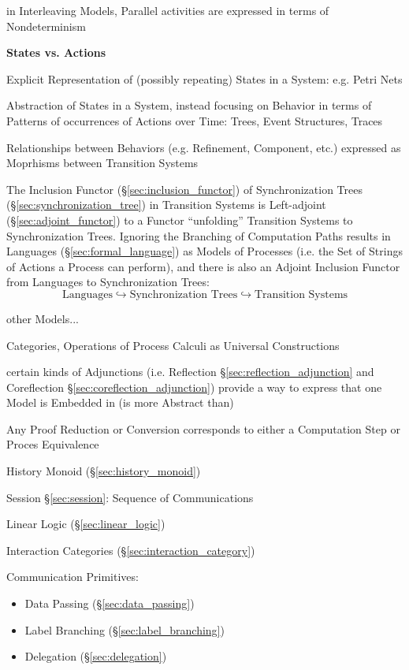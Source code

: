 in Interleaving Models, Parallel activities are expressed in terms of
Nondeterminism


\textbf{States vs. Actions}

Explicit Representation of (possibly repeating) States in a System:
e.g. Petri Nets

Abstraction of States in a System, instead focusing on Behavior in
terms of Patterns of occurrences of Actions over Time: Trees, Event
Structures, Traces


Relationships between Behaviors (e.g. Refinement, Component, etc.)
expressed as Moprhisms between Transition Systems

The Inclusion Functor (\S\ref{sec:inclusion_functor}) of
Synchronization Trees (\S\ref{sec:synchronization_tree}) in Transition
Systems is Left-adjoint (\S\ref{sec:adjoint_functor}) to a Functor
``unfolding'' Transition Systems to Synchronization Trees. Ignoring
the Branching of Computation Paths results in Languages
(\S\ref{sec:formal_language}) as Models of Processes (i.e. the Set of
Strings of Actions a Process can perform), and there is also an
Adjoint Inclusion Functor from Languages to Synchronization Trees:
\[
  \text{Languages} \hookrightarrow \text{Synchronization Trees}
    \hookrightarrow \text{Transition Systems}
\]

other Models...

Categories, Operations of Process Calculi as Universal Constructions

certain kinds of Adjunctions (i.e. Reflection
\S\ref{sec:reflection_adjunction} and Coreflection
\S\ref{sec:coreflection_adjunction}) provide a way to express that one
Model is Embedded in (is more Abstract than)


\asterism


Any Proof Reduction or Conversion corresponds to either a Computation
Step or Proces Equivalence \cite{caires-pfenning10}

History Monoid (\S\ref{sec:history_monoid})

Session \S\ref{sec:session}: Sequence of Communications

Linear Logic (\S\ref{sec:linear_logic})

Interaction Categories (\S\ref{sec:interaction_category})


Communication Primitives:
\begin{itemize}
  \item Data Passing (\S\ref{sec:data_passing})
  \item Label Branching (\S\ref{sec:label_branching})
  \item Delegation (\S\ref{sec:delegation})
\end{itemize}


